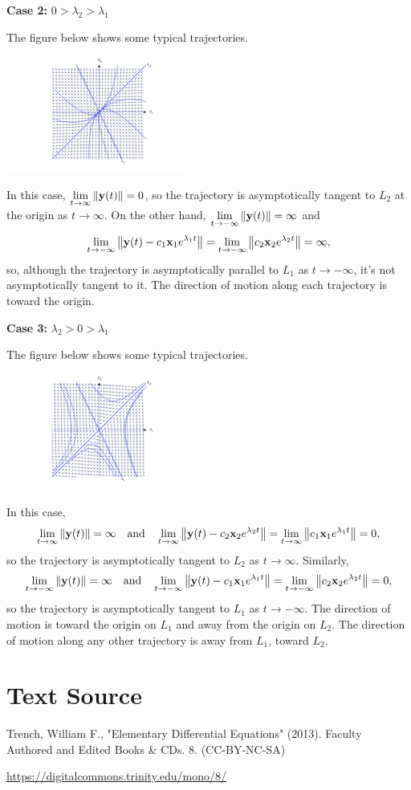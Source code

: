 \documentclass{ximera}
\begin{document}
{\bf Case 2:} $0>\lambda_2>\lambda_1$

The figure below shows
some typical trajectories.

\begin{image}
 \includegraphics[height=1.5in]{fig100405.jpg} 
\end{image}

In this case, $\lim_{t\rightarrow\infty}\norm{{\bf y}(t)}=0$, so the trajectory is
asymptotically tangent to $L_2$ at the origin as $t\rightarrow\infty$. On the
other hand, $\lim_{t\rightarrow-\infty}\norm{{\bf y}(t)}=\infty$ and
$$
\lim_{t\rightarrow-\infty}\norm{{\bf y}(t)-c_1{\bf x}_1e^{\lambda_1
t}}=\lim_{t\rightarrow-\infty}\norm{c_2{\bf x}_2e^{\lambda_2t}}=\infty,
$$
so, although the trajectory is asymptotically parallel to $L_1$ as
$t\rightarrow-\infty$, it's not asymptotically tangent to it.
The direction of motion along each trajectory is toward the origin.

{\bf Case 3:} $\lambda_2>0>\lambda_1$

The figure below shows
some typical trajectories.

\begin{image}
 \includegraphics[height=1.5in]{fig100406.jpg} 
\end{image}

In this case,
$$
\lim_{t\rightarrow\infty}\norm{{\bf y}(t)}=\infty \quad\mbox{and}\quad
\lim_{t\rightarrow\infty}\norm{{\bf y}(t)-c_2{\bf x}_2e^{\lambda_2
t}}=\lim_{t\rightarrow\infty}\norm{c_1{\bf x}_1e^{\lambda_1t}}=0,
$$
so the trajectory is asymptotically tangent to $L_2$ as $t\rightarrow\infty$.
Similarly,
$$
\lim_{t\rightarrow -\infty}\norm{{\bf y}(t)}=\infty \quad\mbox{and}\quad
\lim_{t\rightarrow -\infty}\norm{{\bf y}(t)-c_1{\bf x}_1e^{\lambda_1
t}}=\lim_{t\rightarrow -\infty}\norm{c_2{\bf x}_2e^{\lambda_2t}}=0,
$$
so the trajectory is asymptotically tangent to $L_1$ as $t\rightarrow-\infty$.
The direction of motion is toward the origin on $L_1$ and away from
the origin on $L_2$. The direction of motion along any other
trajectory is away from $L_1$, toward $L_2$.




\section*{Text Source}
Trench, William F., "Elementary Differential Equations" (2013). Faculty Authored and Edited Books \& CDs. 8. (CC-BY-NC-SA)

\href{https://digitalcommons.trinity.edu/mono/8/}{https://digitalcommons.trinity.edu/mono/8/}
\end{document}
